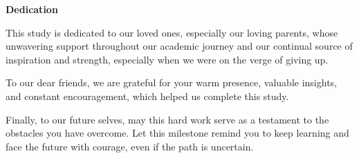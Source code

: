 \begin{center}
	\textbf{Dedication}
\end{center}

This study is dedicated to our loved ones, especially our loving parents, whose unwavering support throughout our academic journey and our continual source of inspiration and strength, especially when we were on the verge of giving up. 

To our dear friends, we are grateful for your warm presence, valuable insights, and constant encouragement, which helped us complete this study. 

Finally, to our future selves, may this hard work serve as a testament to the obstacles you have overcome. Let this milestone remind you to keep learning and face the future with courage, even if the path is uncertain. 

